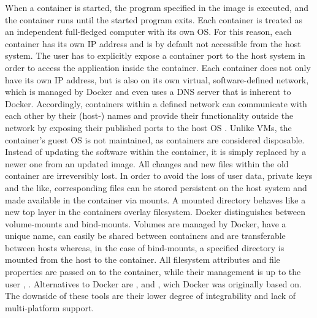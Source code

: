         
        When a container is started, the program specified in the image is executed, and the container runs until the started program exits. Each container is treated as an independent full-fledged computer with its own \ac{OS}. For this reason, each container has its own IP address and is by default not accessible from the host system. The user has to explicitly expose a container port to the host system in order to access the application inside the container. Each container does not only have its own IP address, but is also on its own virtual, software-defined network, which is managed by Docker and even uses a \ac{DNS} server that is inherent to Docker. Accordingly, containers within a defined network can communicate with each other by their (host-) names and provide their functionality outside the network by exposing their published ports to the host \ac{OS} \cite{docker2020}.\newline
        Unlike \ac{VM}s, the container's guest \ac{OS} is not maintained, as containers are considered disposable. Instead of updating the software within the container, it is simply replaced by a newer one from an updated image. All changes and new files within the old container are irreversibly lost. In order to avoid the loss of user data, private keys and the like, corresponding files can be stored persistent on the host system and made available in the container via mounts. A mounted directory behaves like a new top layer in the containers overlay filesystem. Docker distinguishes between volume-mounts and bind-mounts. Volumes are managed by Docker, have a unique name, can easily be shared between containers and are transferable between hosts whereas, in the case of bind-mounts, a specified directory is mounted from the host to the container. All filesystem attributes and file properties are passed on to the container, while their management is up to the user \cite{docker2020}, \cite{dockerdocs}.\newline
        Alternatives to Docker are ,  and , wich Docker was originally based on. The downside of these tools are their lower degree of integrability and lack of multi-platform support.

